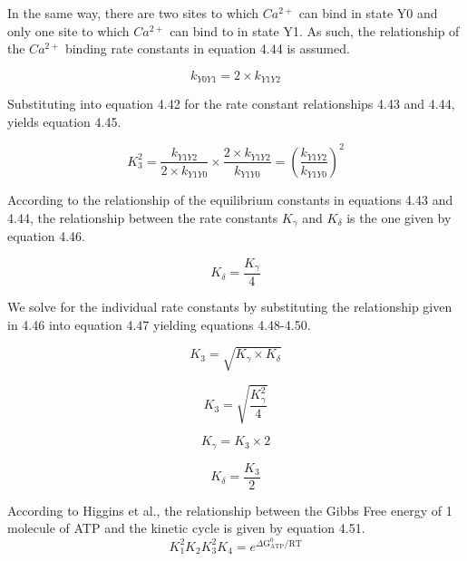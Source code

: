 \documentclass[12pt]{ucsddissertation}
\begin{document}
In the same way, there are two sites to which $Ca^{2+}$ can bind in state Y0 and only one site to which $Ca^{2+}$ can bind to in state Y1. As such, the relationship of the $Ca^{2+}$ binding rate constants in equation 4.44 is assumed. 


\begin{equation}
k_{Y0Y1}=2 \times k_{Y1Y2} 
\end{equation} 

Substituting into equation 4.42 for the rate constant relationships 4.43 and 4.44, yields equation 4.45.

\begin{equation}
K^{2}_{3}=  \frac{k_{Y1Y2}}{2 \times k_{Y1Y0}} \times \frac{2 \times k_{Y1Y2}}{k_{Y1Y0}} = \left(\frac{k_{Y1Y2}}{k_{Y1Y0}}\right)^{2}
\end{equation}

According to the relationship of the equilibrium constants in equations 4.43 and 4.44, the relationship between the rate constants $K_{\gamma}$ and $K_{\delta}$ is the one given by equation 4.46.

\begin{equation}
K_{\delta}= \frac{K_{\gamma}}{4}
\end{equation}

We solve for the individual rate constants by substituting the relationship given in 4.46 into equation 4.47 yielding equations 4.48-4.50. 


\begin{equation}
K_{3}= \sqrt{K_{\gamma} \times K_{\delta}}
\end{equation}


\begin{equation}
K_{3}= \sqrt{\frac{K_{\gamma}^2}{4}}
\end{equation}

\begin{equation}
K_{\gamma}= K_{3} \times 2
\end{equation}

\begin{equation}
K_{\delta}= \frac{K_{3}}{2} 
\end{equation}

According to Higgins et al., the relationship between the Gibbs Free energy of 1 molecule of ATP and the kinetic cycle is given by equation 4.51.
\begin{equation}
K _ { 1 } ^ { 2 }   K _ { 2 } K _ { 3 } ^ { 2 } K _ { 4 } = e ^ { \Delta \mathrm { G } _ { \mathrm { ATP } } ^ { 0 } / \mathrm { RT } }
\end{equation}
\end{document}
